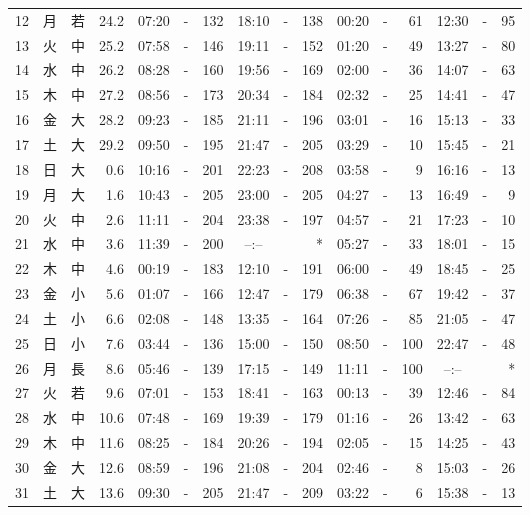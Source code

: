 \documentclass[12pt.a4j]{jsarticle}
\begin{document}
\begin{center}
\begin{table}[ht]
\begin{tabular}{|rc|cr|ccrccr|ccrccr|}
12 & 月 & 若 & 24.2 & 07:20 &-& 132 & 18:10 &-& 138 & 00:20 &-&  61 & 12:30 &-&  95 \\
13 & 火 & 中 & 25.2 & 07:58 &-& 146 & 19:11 &-& 152 & 01:20 &-&  49 & 13:27 &-&  80 \\
14 & 水 & 中 & 26.2 & 08:28 &-& 160 & 19:56 &-& 169 & 02:00 &-&  36 & 14:07 &-&  63 \\
15 & 木 & 中 & 27.2 & 08:56 &-& 173 & 20:34 &-& 184 & 02:32 &-&  25 & 14:41 &-&  47 \\
16 & 金 & 大 & 28.2 & 09:23 &-& 185 & 21:11 &-& 196 & 03:01 &-&  16 & 15:13 &-&  33 \\
17 & 土 & 大 & 29.2 & 09:50 &-& 195 & 21:47 &-& 205 & 03:29 &-&  10 & 15:45 &-&  21 \\
18 & 日 & 大 &  0.6 & 10:16 &-& 201 & 22:23 &-& 208 & 03:58 &-&   9 & 16:16 &-&  13 \\
19 & 月 & 大 &  1.6 & 10:43 &-& 205 & 23:00 &-& 205 & 04:27 &-&  13 & 16:49 &-&   9 \\
20 & 火 & 中 &  2.6 & 11:11 &-& 204 & 23:38 &-& 197 & 04:57 &-&  21 & 17:23 &-&  10 \\
21 & 水 & 中 &  3.6 & 11:39 &-& 200 & --:-- & &  *  & 05:27 &-&  33 & 18:01 &-&  15 \\
22 & 木 & 中 &  4.6 & 00:19 &-& 183 & 12:10 &-& 191 & 06:00 &-&  49 & 18:45 &-&  25 \\
23 & 金 & 小 &  5.6 & 01:07 &-& 166 & 12:47 &-& 179 & 06:38 &-&  67 & 19:42 &-&  37 \\
24 & 土 & 小 &  6.6 & 02:08 &-& 148 & 13:35 &-& 164 & 07:26 &-&  85 & 21:05 &-&  47 \\
25 & 日 & 小 &  7.6 & 03:44 &-& 136 & 15:00 &-& 150 & 08:50 &-& 100 & 22:47 &-&  48 \\
26 & 月 & 長 &  8.6 & 05:46 &-& 139 & 17:15 &-& 149 & 11:11 &-& 100 & --:-- & &  *  \\
27 & 火 & 若 &  9.6 & 07:01 &-& 153 & 18:41 &-& 163 & 00:13 &-&  39 & 12:46 &-&  84 \\
28 & 水 & 中 & 10.6 & 07:48 &-& 169 & 19:39 &-& 179 & 01:16 &-&  26 & 13:42 &-&  63 \\
29 & 木 & 中 & 11.6 & 08:25 &-& 184 & 20:26 &-& 194 & 02:05 &-&  15 & 14:25 &-&  43 \\
30 & 金 & 大 & 12.6 & 08:59 &-& 196 & 21:08 &-& 204 & 02:46 &-&   8 & 15:03 &-&  26 \\
31 & 土 & 大 & 13.6 & 09:30 &-& 205 & 21:47 &-& 209 & 03:22 &-&   6 & 15:38 &-&  13 \\
\hline
\end{tabular}

\end{table}
\end{center}
\end{document}
